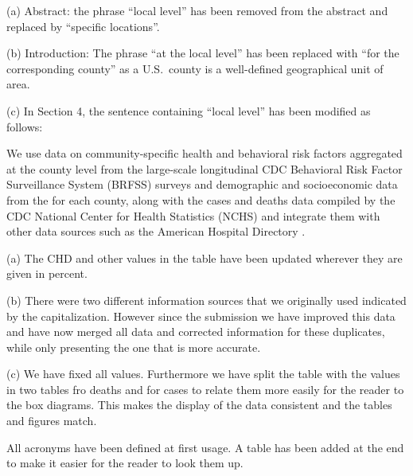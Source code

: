   {

  (a) Abstract: the phrase ``local level'' has been removed from the abstract and replaced by ``specific locations''.

  (b) Introduction: The phrase ``at the local level'' has been replaced with ``for the corresponding county'' as a U.S.~county is a well-defined geographical unit of area.

  (c) In Section 4, the sentence containing   ``local level'' has been modified as follows:
  
We use data on community-specific health and behavioral risk factors
aggregated at the county level from the large-scale longitudinal CDC
Behavioral Risk Factor Surveillance System (BRFSS) surveys
\citep{www-cdc-brfss} and demographic and socioeconomic data from the
\citet{www-sensus} for each county, along with the cases and deaths data compiled by
the CDC National Center for Health Statistics (NCHS)
\citep{www-cdc-nchs} and integrate them with other data sources such as the American Hospital Directory \citep{www-ahd}.



}

%
{ (a) The CHD and other values in the table have been updated wherever
  they are given in percent.

  (b) There were two different information sources that we originally
  used indicated by the capitalization. However since the submission
  we have improved this data and have now merged all data and
  corrected information for these duplicates, while only presenting
  the one that is more accurate.

  (c) We have fixed all values. Furthermore we have split the table with the values in two tables fro deaths and for cases to relate them more easily for the reader to the box diagrams. This makes the display of the data consistent and the tables and figures match. 
}



{All acronyms have been defined at first usage. A table has been added
  at the end to make it easier for the reader to look them up.}


